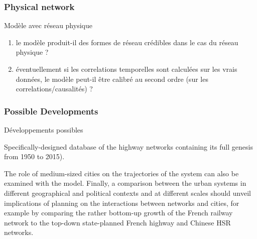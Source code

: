 \subsubsection{Physical network}{Modèle avec réseau physique}


\begin{enumerate}
\item le modèle produit-il des formes de réseau crédibles dans le cas du réseau physique ?
\item éventuellement si les correlations temporelles sont calculées sur les vrais données, le modèle peut-il être calibré au second ordre (sur les correlations/causalités) ?
\end{enumerate}






\subsubsection{Possible Developments}{Développements possibles}


Specifically-designed database of the highway networks containing its full genesis from 1950 to 2015).


The role of medium-sized cities on the trajectories of the system can also be examined with the model. Finally, a comparison between the urban systems in different geographical and political contexts and at different scales should unveil implications of planning on the interactions between networks and cities, for example by comparing the rather bottom-up growth of the French railway network to the top-down state-planned French highway and Chinese HSR networks.










